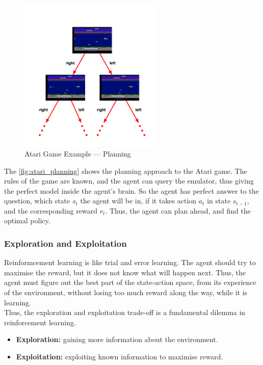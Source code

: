 \begin{figure}[!htp]
    \centering
    \includegraphics[width=0.6\textwidth]{figures/atari_planning.png}
    \caption{Atari Game Example --- Planning}
    \label{fig:atari_planning}
\end{figure}
The \autoref{fig:atari_planning} shows the planning approach to the Atari game. 
The rules of the game are known, and the agent can query the emulator, thus 
giving the perfect model inside the agent's brain. So the agent has 
perfect answer to the question, which state \(s_t\) the agent will be in, if it takes
action \(a_t\) in state \(s_{t-1}\), and the corresponding reward \(r_t\).
Thus, the agent can plan ahead, and find the optimal policy.

\subsubsection{Exploration and Exploitation}
Reinformcement learning is like trial and error learning. The agent should try to maximise the
reward, but it does not know what will happen next. Thus, the agent must figure out the 
best part of the state-action space, from its experience of the environment, without
losing too much reward along the way, while it is learning.\\

Thus, the exploration and exploitation trade-off is a fundamental dilemma in reinforcement learning.
\begin{itemize}
    \item \textbf{Exploration:} gaining more information about the environment.
    \item \textbf{Exploitation:} exploiting known information to maximise reward.
\end{itemize}